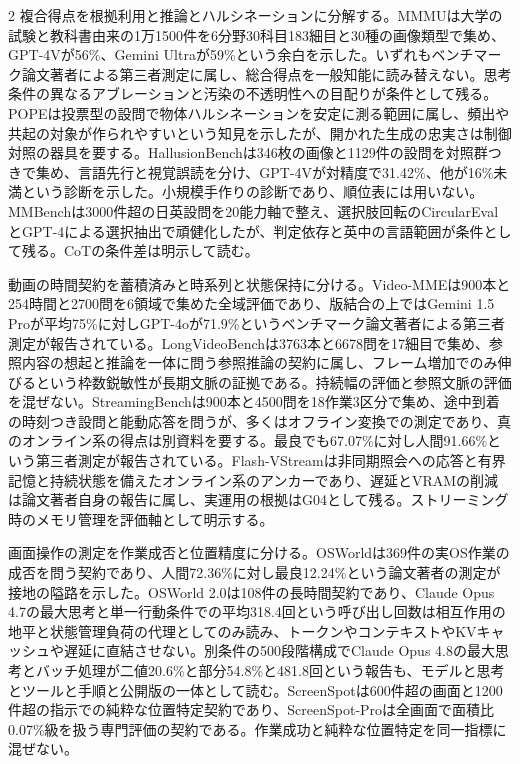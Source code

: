 \documentclass[lualatex,a4paper,10pt]{jlreq}
\begin{document}
\begin{multicols}{2}
\noindent 複合得点を根拠利用と推論とハルシネーションに分解する。MMMUは大学の試験と教科書由来の1万1500件を6分野30科目183細目と30種の画像類型で集め、GPT-4Vが56\%、Gemini Ultraが59\%という余白を示した。いずれもベンチマーク論文著者による第三者測定に属し、総合得点を一般知能に読み替えない。思考条件の異なるアブレーションと汚染の不透明性への目配りが条件として残る。POPEは投票型の設問で物体ハルシネーションを安定に測る範囲に属し、頻出や共起の対象が作られやすいという知見を示したが、開かれた生成の忠実さは制御対照の器具を要する。HallusionBenchは346枚の画像と1129件の設問を対照群つきで集め、言語先行と視覚誤読を分け、GPT-4Vが対精度で31.42\%、他が16\%未満という診断を示した。小規模手作りの診断であり、順位表には用いない。MMBenchは3000件超の日英設問を20能力軸で整え、選択肢回転のCircularEvalとGPT-4による選択抽出で頑健化したが、判定依存と英中の言語範囲が条件として残る。CoTの条件差は明示して読む。\autocite{vmd078,vmd079,vmd080,vmd081}\par\medskip
\noindent 動画の時間契約を蓄積済みと時系列と状態保持に分ける。Video-MMEは900本と254時間と2700問を6領域で集めた全域評価であり、版結合の上ではGemini 1.5 Proが平均75\%に対しGPT-4oが71.9\%というベンチマーク論文著者による第三者測定が報告されている。LongVideoBenchは3763本と6678問を17細目で集め、参照内容の想起と推論を一体に問う参照推論の契約に属し、フレーム増加でのみ伸びるという枠数鋭敏性が長期文脈の証拠である。持続幅の評価と参照文脈の評価を混ぜない。StreamingBenchは900本と4500問を18作業3区分で集め、途中到着の時刻つき設問と能動応答を問うが、多くはオフライン変換での測定であり、真のオンライン系の得点は別資料を要する。最良でも67.07\%に対し人間91.66\%という第三者測定が報告されている。Flash-VStreamは非同期照会への応答と有界記憶と持続状態を備えたオンライン系のアンカーであり、遅延とVRAMの削減は論文著者自身の報告に属し、実運用の根拠はG04として残る。ストリーミング時のメモリ管理を評価軸として明示する。\autocite{vmd086,vmd087,vmd088,vmd089}\par\medskip
\noindent 画面操作の測定を作業成否と位置精度に分ける。OSWorldは369件の実OS作業の成否を問う契約であり、人間72.36\%に対し最良12.24\%という論文著者の測定が接地の隘路を示した。OSWorld 2.0は108件の長時間契約であり、Claude Opus 4.7の最大思考と単一行動条件での平均318.4回という呼び出し回数は相互作用の地平と状態管理負荷の代理としてのみ読み、トークンやコンテキストやKVキャッシュや遅延に直結させない。別条件の500段階構成でClaude Opus 4.8の最大思考とバッチ処理が二値20.6\%と部分54.8\%と481.8回という報告も、モデルと思考とツールと手順と公開版の一体として読む。ScreenSpotは600件超の画面と1200件超の指示での純粋な位置特定契約であり、ScreenSpot-Proは全画面で面積比0.07\%級を扱う専門評価の契約である。作業成功と純粋な位置特定を同一指標に混ぜない。\autocite{vmd090,vmd091,vmd092,vmd120}\par\medskip

\end{multicols}
\end{document}
